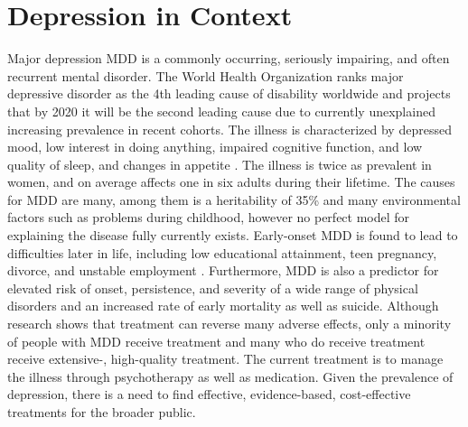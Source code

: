 \section{Depression in Context}
Major depression MDD is a commonly occurring, seriously impairing, and often recurrent mental disorder. The World Health Organization ranks major depressive disorder as the 4th leading cause of disability worldwide \cite{murray1996} and projects that by 2020 it will be the second leading cause due to currently unexplained increasing prevalence in recent cohorts. The illness is characterized by depressed mood, low interest in doing anything, impaired cognitive function, and low quality of sleep, and changes in appetite \cite{mdd}. The illness is twice as prevalent in women, and on average affects one in six adults during their lifetime. The causes for MDD are many, among them is a heritability of 35\% and many environmental factors such as problems during childhood, however no perfect model for explaining the disease fully currently exists. Early-onset MDD is found to lead to difficulties later in life, including low educational attainment, teen pregnancy, divorce, and unstable employment \cite{costs_of_depression}. Furthermore, MDD is also a predictor for elevated risk of onset, persistence, and severity of a wide range of physical disorders and an increased rate of early mortality as well as suicide. Although research shows that treatment can reverse many adverse effects, only a minority of people with MDD receive treatment and many who do receive treatment receive extensive-, high-quality treatment. The current treatment is to manage the illness through psychotherapy as well as medication. Given the prevalence of depression, there is a need to find effective, evidence-based, cost-effective treatments for the broader public. 

